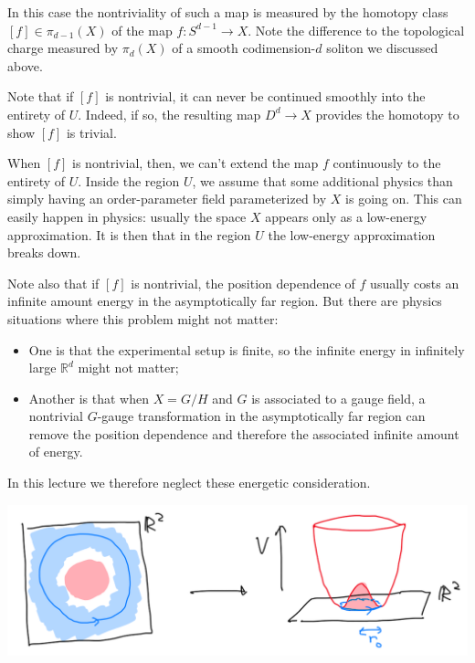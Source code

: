 \documentclass[12pt]{article}
\numberwithin{equation}{section}
\theoremstyle{remark}
\renewenvironment{figure}[1][]{
  \begin{originalfigure}[#1]
    \begin{mdframed}[linecolor=black!0,backgroundcolor=black!1]
}{
    \end{mdframed}
  \end{originalfigure}
}
\def\bR{\mathbb{R}}
\begin{document}
In this case the nontriviality of such a map is measured by the homotopy class $[f]\in \pi_{d-1}(X)$
of the map $f: S^{d-1}\to X$.
Note the difference to the topological charge measured by  $\pi_d(X)$ of a smooth codimension-$d$ soliton
we discussed above.

Note that if $[f]$ is nontrivial,
it can never be continued smoothly into the entirety of $U$.
Indeed, if so, the resulting map $D^{d}\to X$ provides the homotopy to show $[f]$ is trivial.

When $[f]$ is nontrivial, then, we can't extend the map $f$ continuously to the entirety of $U$.
Inside the region $U$, we assume that some additional physics than 
simply having an order-parameter field parameterized by $X$ is going on.
This can easily happen in physics: usually the space $X$ appears only as a low-energy approximation.
It is then  that in the region $U$ the low-energy approximation breaks down.

Note also that if $[f]$ is nontrivial,
the position dependence of $f$ usually costs an infinite amount energy in the asymptotically far region.
But there are physics situations where this problem might not matter:
\begin{itemize}
\item One is that the experimental setup is finite, so the infinite energy in infinitely large $\bR^d$ might not matter;
\item Another is that when $X=G/H$ and $G$ is associated to a gauge field,
a nontrivial $G$-gauge transformation in the asymptotically far region can remove the position dependence
and therefore the associated infinite amount of energy.
\end{itemize}
In this lecture we therefore neglect these energetic consideration.

\begin{figure}[h]
\centering
\includegraphics[width=.7\textwidth]{vortex.png}
\caption{A vortex configuration. 
In the asymptotic region, the field values are at the bottom of the potential.
In the core region, the field values come to the origin of the field space.}
\label{fig:vortex}
\end{figure}
\end{document}
